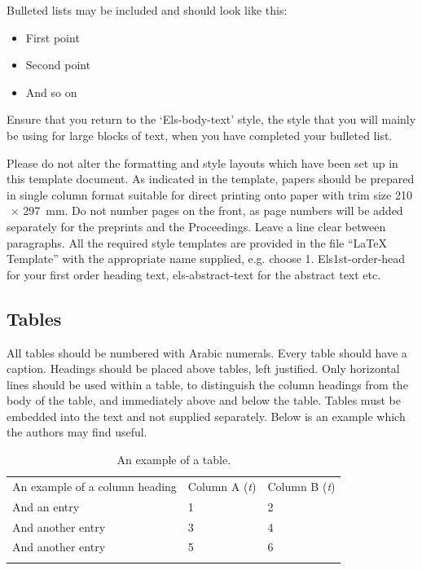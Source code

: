 \documentclass[3p,times,procedia,twocolumn,twoside]{elsarticle}
\begin{document}
\enlargethispage{-13mm}

Bulleted lists may be included and should look like this:
\begin{itemize}[]
\item First point
\item Second point
\item And so on
\end{itemize}

Ensure that you return to the `Els-body-text' style, the style that
you will mainly be using for large blocks of text, when you have
completed your bulleted list.

Please do not alter the formatting and style layouts which have been
set up in this template document. As indicated in the template, papers
should be prepared in single column format suitable for direct
printing onto paper with trim size 210$\,\times\,$297~mm. Do not
number pages on the front, as page numbers will be added separately
for the preprints and the Proceedings. Leave a line clear between
paragraphs. All the required style templates are provided in the file
``LaTeX Template'' with the appropriate name supplied, e.g. choose
1. Els1st-order-head for your first order heading text,
els-abstract-text for the abstract text etc.

\subsection{ Tables}

All tables should be numbered with Arabic numerals. Every table should
have a caption. Headings should be placed above tables, left
justified. Only horizontal lines should be used within a table, to
distinguish the column headings from the body of the table, and
immediately above and below the table. Tables must be embedded into
the text and not supplied separately. Below is an example which the
authors may find useful.

\begin{table}[t]
\caption{An example of a table.}
\begin{tabular*}{\hsize}{@{\extracolsep{\fill}}lll@{}}
\toprule
An example of a column heading & Column A ({\it{t}}) & Column B ({\it{t}})\\
\colrule
And an entry &   1 &  2\\
And another entry  & 3 &  4\\
And another entry &  5 &  6\\
\botrule
\end{tabular*}
\end{table}
\end{document}
